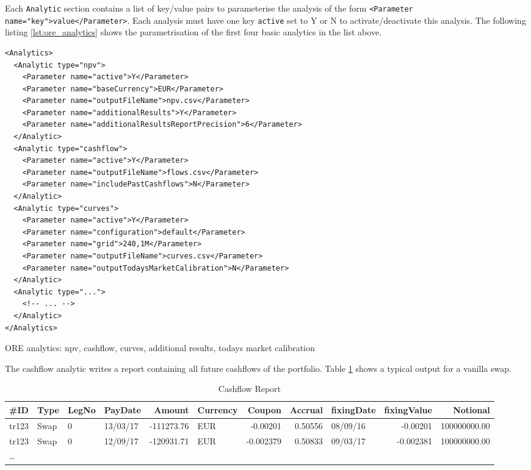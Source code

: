 \documentclass[12pt, a4paper]{article}
\begin{document}
Each {\tt Analytic} section contains a list of key/value pairs to parameterise the analysis of the form {\tt <Parameter
  name="key">value</Parameter>}. Each analysis must have one key {\tt active} set to Y or N to activate/deactivate this
analysis.  The following listing \ref{lst:ore_analytics} shows the parametrisation of the first four basic analytics in
the list above.

\begin{listing}[H]
\begin{verbatim}
<Analytics>    
  <Analytic type="npv">
    <Parameter name="active">Y</Parameter>
    <Parameter name="baseCurrency">EUR</Parameter>
    <Parameter name="outputFileName">npv.csv</Parameter>
    <Parameter name="additionalResults">Y</Parameter>
    <Parameter name="additionalResultsReportPrecision">6</Parameter>
  </Analytic>      
  <Analytic type="cashflow">
    <Parameter name="active">Y</Parameter>
    <Parameter name="outputFileName">flows.csv</Parameter>
    <Parameter name="includePastCashflows">N</Parameter>
  </Analytic>      
  <Analytic type="curves">
    <Parameter name="active">Y</Parameter>
    <Parameter name="configuration">default</Parameter>
    <Parameter name="grid">240,1M</Parameter>
    <Parameter name="outputFileName">curves.csv</Parameter>
    <Parameter name="outputTodaysMarketCalibration">N</Parameter>
  </Analytic>
  <Analytic type="...">
    <!-- ... -->
  </Analytic>      
</Analytics>      
\end{verbatim}
\caption{ORE analytics: npv, cashflow, curves, additional results, todays market calibration}
\label{lst:ore_analytics}
\end{listing}

The cashflow analytic writes a report containing all future cashflows of the portfolio. Table \ref{cashflowreport} shows
a typical output for a vanilla swap.

\begin{table}[hbt]
\scriptsize
\begin{center}
  \begin{tabular}{l|l|l|l|r|l|r|r|l|r|r}
\hline
\#ID & Type & LegNo & PayDate & Amount & Currency & Coupon & Accrual & fixingDate & fixingValue & Notional \\
\hline
\hline
tr123 & Swap & 0 & 13/03/17 & -111273.76 & EUR & -0.00201 & 0.50556 & 08/09/16 & -0.00201 & 100000000.00 \\
tr123 & Swap & 0 & 12/09/17 & -120931.71 & EUR & -0.002379 & 0.50833 & 09/03/17 & -0.002381 & 100000000.00 \\
\ldots
\end{tabular}
\caption{Cashflow Report}
\label{cashflowreport}
\end{center}
\end{table}
\end{document}
